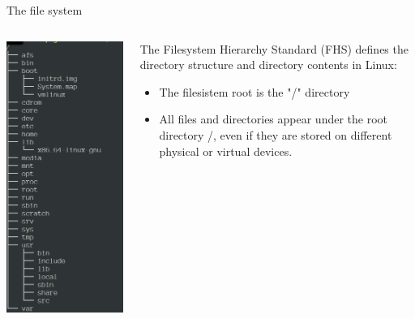 \documentclass[unknownkeysallowed, 10pt, a4 paper, handout]{beamer}
\begin{document}
\begin{frame}[label=filesystem]{The file system}
  \begin{columns}[T]
    \begin{column}{.23\textwidth}
      \includegraphics[scale=0.29]{pics/fs.png}
    \end{column}
    \hfill
    \begin{column}{.73\textwidth}
      \small{
      The Filesystem Hierarchy Standard (FHS) defines the directory
      structure and directory contents in Linux:
      \begin{itemize}
        \item The filesistem root is the "/" directory
        \item All files and directories appear under the root directory /,
          even if they are stored on different physical or virtual devices.

\end{itemize}}
\end{column}
\end{columns}
\end{frame}
\end{document}
